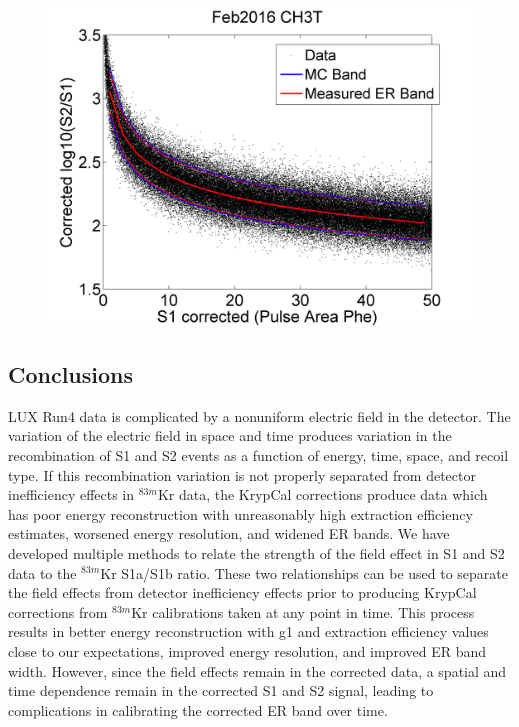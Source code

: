 \begin{figure}[!h]
\includegraphics[scale=0.45]{Run04Corrections/Feb2016_ERPrediction.png}
 \label{Feb2016ERPred}
\end{figure}

\subsection{Conclusions}

LUX Run4 data is complicated by a nonuniform electric field in the detector.  The variation of the electric field in space and time produces variation in the recombination of S1 and S2 events as a function of energy, time, space, and recoil type.  If this recombination variation is not properly separated from detector inefficiency effects in $^{83m}$Kr data, the KrypCal corrections produce data which has poor energy reconstruction with unreasonably high extraction efficiency estimates, worsened energy resolution, and widened ER bands.  We have developed multiple methods to relate the strength of the field effect in S1 and S2 data to the $^{83m}$Kr S1a/S1b ratio.  These two relationships can be used to separate the field effects from detector inefficiency effects prior to producing KrypCal corrections from $^{83m}$Kr calibrations taken at any point in time.  This process results in better energy reconstruction with g1 and extraction efficiency values close to our expectations,  improved energy resolution, and improved ER band width.  However, since the field effects remain in the corrected data, a spatial and time dependence remain in the corrected S1 and S2 signal, leading to complications in calibrating the corrected ER band over time.
